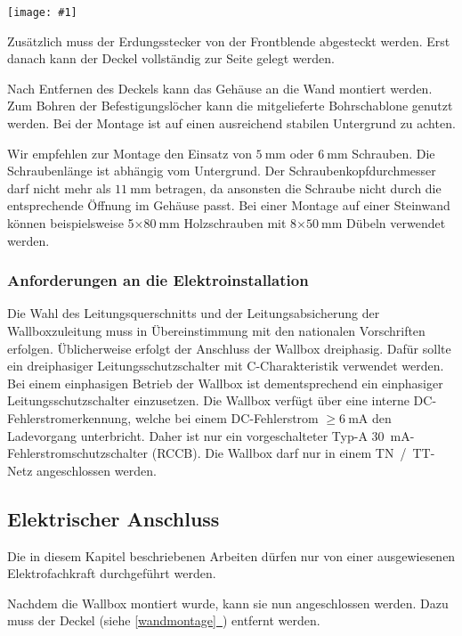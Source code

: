 \documentclass[a4paper,10pt]{article}
\newcommand{\hint}[1]{\begin{tcolorbox}[colback=boxgray,colframe=black,coltext=
white,title=Hinweis,left*=2mm,right*=2mm,boxsep=1mm,bottom=1mm,top=1mm]#1\end{tcolorbox}}
\newcommand{\gfx}[1]{\texttt{[image: \#1]}}
\newcommand*{\fullref}[1]{\hyperref[{#1}]{\ref*{#1}~\nameref*{#1}}}
\begin{document}
\begin{multicols*}{2}
	\gfx{./img_warp2/resized/warp2_button_and_gnd_600}

	Zusätzlich muss der Erdungsstecker von der Front\-blende abgesteckt werden.
	Erst danach kann der Deckel vollständig zur Seite gelegt werden.

	Nach Entfernen des Deckels kann das Gehäuse an die Wand montiert werden. Zum
	Bohren der Befestigungslöcher kann die mitgelieferte Bohrschablone genutzt
	werden. Bei der Montage ist auf einen ausreichend stabilen Untergrund zu
	achten.

	Wir empfehlen zur Montage den Einsatz von $\SI{5}{\milli\meter}$ oder
	$\SI{6}{\milli\meter}$ Schrauben. Die Schraubenlänge ist abhängig vom
	Untergrund. Der Schraubenkopfdurchmesser darf nicht mehr als
	$\SI{11}{\milli\meter}$ betragen, da ansonsten die Schraube nicht durch die
	entsprechende Öffnung im Gehäuse passt. Bei einer Montage auf einer Steinwand
	können beispielsweise 5$\times\SI{80}{\milli\meter}$ Holzschrauben
	mit 8$\times\SI{50}{\milli\meter}$ Dübeln  verwendet werden.

	\subsubsection{Anforderungen an die Elektroinstallation}
	Die Wahl des Leitungsquerschnitts und der Lei\-tungs\-ab\-sicher\-ung der
	Wallboxzuleitung muss in Übereinstimmung mit den nationalen Vorschriften
	erfolgen. Üblicherweise erfolgt der Anschluss der Wallbox dreiphasig.
	Dafür sollte ein dreiphasiger Leitungsschutzschalter mit C-Charakteristik
	verwendet werden. Bei einem einphasigen Betrieb der Wallbox ist
	dementsprechend ein einphasiger Leitungsschutzschalter einzusetzen.
	Die Wallbox verfügt über eine interne DC-Fehlerstromerkennung, welche
	bei einem DC-Fehlerstrom $\geq \SI{6}{\milli\ampere}$ den Ladevorgang
	unterbricht. Daher ist nur ein vorgeschalteter Typ-A \SI{30}{\milli\ampere}-Fehlerstromschutzschalter (RCCB).
	Die Wallbox darf nur in einem TN~/~TT-Netz angeschlossen werden.

	\newpage
	\subsection{Elektrischer Anschluss}
	\hint{Die in diesem Kapitel beschriebenen Arbeiten dürfen nur von einer ausgewiesenen
		Elektrofachkraft durchgeführt werden.}

	Nachdem die Wallbox montiert wurde, kann sie nun angeschlossen werden. Dazu
	muss der Deckel (siehe \fullref{wandmontage}) entfernt werden.


\end{multicols*}
\end{document}
